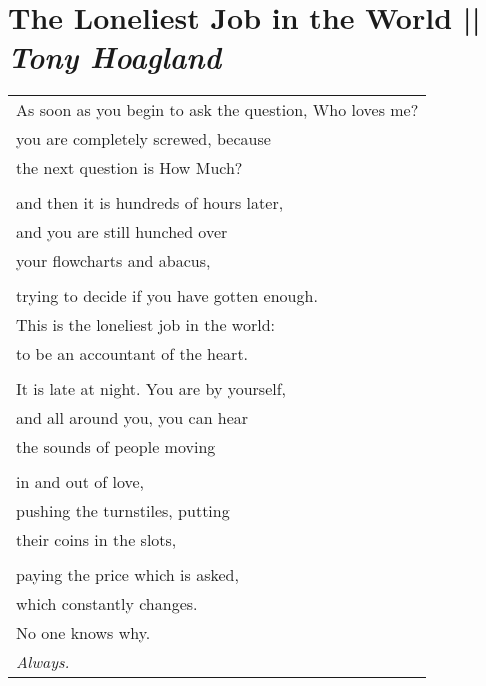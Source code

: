 \section[The Loneliest Job in the World]{The Loneliest Job in the World || \emph{Tony Hoagland} \hspace*{\fill}  \thepage}
\hspace{0pt}
\vfill
\begin{center}
\begin{tabular}{l}
As soon as you begin to ask the question, Who loves me?\\
you are completely screwed, because\\
the next question is How Much?\\
\\and then it is hundreds of hours later,\\
and you are still hunched over\\
your flowcharts and abacus,\\
\\trying to decide if you have gotten enough.\\
This is the loneliest job in the world:\\
to be an accountant of the heart.\\
\\It is late at night. You are by yourself,\\
and all around you, you can hear\\
the sounds of people moving\\
\\in and out of love,\\
pushing the turnstiles, putting\\
their coins in the slots,\\
\\paying the price which is asked,\\
which constantly changes.\\
No one knows why.\\
\emph{Always.}
\end{tabular}
\end{center}
\vfill
\hspace{0pt}